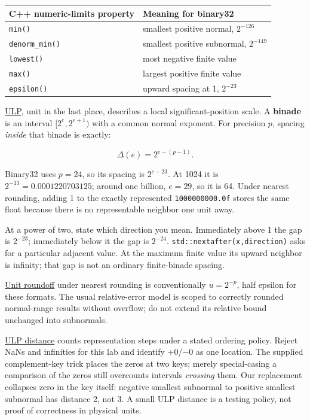 {\def\LTcaptype{none} %
\begin{longtable}[]{@{}ll@{}}
\toprule\noalign{}
C++ numeric-limits property & Meaning for binary32 \\
\midrule\noalign{}
\endhead
\bottomrule\noalign{}
\endlastfoot
\texttt{min()} & smallest positive normal, \(2^{-126}\) \\
\texttt{denorm\_min()} & smallest positive subnormal, \(2^{-149}\) \\
\texttt{lowest()} & most negative finite value \\
\texttt{max()} & largest positive finite value \\
\texttt{epsilon()} & upward spacing at 1, \(2^{-23}\) \\
\end{longtable}
}

\hyperref[appendix-14bab4cab9d4]{ULP}, unit in the last place, describes a local significant-position scale. A \textbf{binade} is an interval \([2^e,2^{e+1})\) with a common normal exponent. For precision \(p\), spacing \emph{inside} that binade is exactly:

\[
\Delta(e)=2^{e-(p-1)}.
\]

Binary32 uses \(p=24\), so its spacing is \(2^{e-23}\). At 1024 it is \(2^{-13}=0.0001220703125\); around one billion, \(e=29\), so it is 64. Under nearest rounding, adding 1 to the exactly represented \texttt{1\textquotesingle{}000\textquotesingle{}000\textquotesingle{}000.0f} stores the same float because there is no representable neighbor one unit away.

At a power of two, state which direction you mean. Immediately above 1 the gap is \(2^{-23}\); immediately below it the gap is \(2^{-24}\). \texttt{std::nextafter(x,direction)} asks for a particular adjacent value. At the maximum finite value its upward neighbor is infinity; that gap is not an ordinary finite-binade spacing.

\hyperref[appendix-bc44f7b42f42]{Unit roundoff} under nearest rounding is conventionally \(u=2^{-p}\), half epsilon for these formats. The usual relative-error model is scoped to correctly rounded normal-range results without overflow; do not extend its relative bound unchanged into subnormals.

\hyperref[appendix-deca299ae4b8]{ULP distance} counts representation steps under a stated ordering policy. Reject NaNs and infinities for this lab and identify +0/−0 as one location. The supplied complement-key trick places the zeros at two keys; merely special-casing a comparison of the zeros still overcounts intervals \emph{crossing} them. Our replacement collapses zero in the key itself: negative smallest subnormal to positive smallest subnormal has distance 2, not 3. A small ULP distance is a testing policy, not proof of correctness in physical units.

